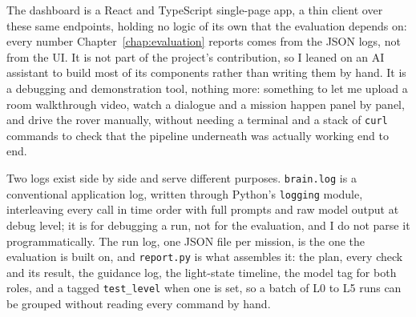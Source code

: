 The dashboard is a React and TypeScript single-page app, a thin client over
these same endpoints, holding no logic of its own that the evaluation
depends on: every number Chapter~\ref{chap:evaluation} reports comes from
the JSON logs, not from the UI. It is not part of the project's
contribution, so I leaned on an AI assistant to build most of its
components rather than writing them by hand. It is a debugging and
demonstration tool, nothing more: something to let me upload a room
walkthrough video, watch a dialogue and a mission happen panel by panel,
and drive the rover manually, without needing a terminal and a stack of
\texttt{curl} commands to check that the pipeline underneath was actually
working end to end.

\label{sec:logging}

Two logs exist side by side and serve different purposes. \texttt{brain.log}
is a conventional application log, written through Python's \texttt{logging}
module, interleaving every call in time order with full prompts and raw
model output at debug level; it is for debugging a run, not for the
evaluation, and I do not parse it programmatically. The run log, one JSON
file per mission, is the one the evaluation is built on, and
\texttt{report.py} is what assembles it: the plan, every check and its
result, the guidance log, the light-state timeline, the model tag for both
roles, and a tagged \texttt{test\_level} when one is set, so a batch of L0
to L5 runs can be grouped without reading every command by hand.

